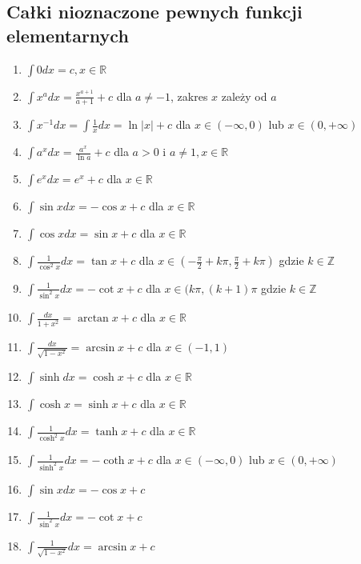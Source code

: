 \documentclass[11pt]{article}
\begin{document}
\subsection{Całki nioznaczone pewnych funkcji elementarnych}
\label{sec:orge8ebcaa}
\begin{enumerate}
\item \(\displaystyle\int 0 dx = c , x \in \mathbb{R}\)
\item \(\displaystyle\int x^{a}dx = \frac{x^{a+1}}{a + 1} +c\) dla \(a \ne -1\), zakres \(x\) zależy od \(a\)
\item \(\displaystyle\int x^{-1}dx = \int \frac{1}{x}dx = \ln |x| + c\) dla \(x \in ( - \infty,0 )\) lub \(x \in (0, + \infty)\)
\item \(\displaystyle\int a^x dx = \frac{a^x}{\ln a} + c\) dla \(a>0\) i \(a \ne 1, x \in \mathbb{R}\)
\item \(\displaystyle\int e^{x} dx = e^x + c\) dla \(x \in \mathbb{R}\)
\item \(\displaystyle\int \sin x dx = -\cos x +c\) dla \(x \in \mathbb{R}\)
\item \(\displaystyle\int \cos x dx = \sin x + c\) dla \(x \in \mathbb{R}\)
\item \(\displaystyle\int \frac{1}{\cos^2 x}dx = \tan x + c\) dla \(\displaystyle x \in \left( - \frac{\pi}{2} + k \pi, \frac{\pi}{2}+k \pi \right)\) gdzie \(k \in \mathbb{Z}\)
\item \(\displaystyle\int \frac{1}{\sin^2 x}dx = - \cot x+c\) dla \(x \in (k\pi, (k+1)\pi\) gdzie \(k \in \mathbb{Z}\)
\item \(\displaystyle\int \frac{dx}{1 + x^2} = \arctan x + c\) dla \(x \in \mathbb{R}\)
\item \(\displaystyle\int \frac{dx}{\sqrt{1-x^2}} = \arcsin x + c\) dla \(x \in (-1, 1)\)
\item \(\displaystyle\int \sinh dx = \cosh x + c\) dla \(x \in \mathbb{R}\)
\item \(\displaystyle\int \cosh x = \sinh x + c\) dla \(x \in \mathbb{R}\)
\item \(\displaystyle\int \frac{1}{\cosh^2 x} dx = \tanh x + c\) dla \(x \in \mathbb{R}\)
\item \(\displaystyle\int \frac{1}{\sinh^2 x} dx = - \coth x + c\) dla \(x \in ( - \infty , 0 )\) lub \(x \in (0 , + \infty)\)
\item \(\displaystyle\int \sin x dx = -\cos x + c\)
\item \(\displaystyle\int \frac{1}{\sin^2 x}dx = -\cot x + c\)
\item \(\displaystyle\int \frac{1}{\sqrt{1 -x ^2}}dx = \arcsin x + c\)
\end{enumerate}
\end{document}
